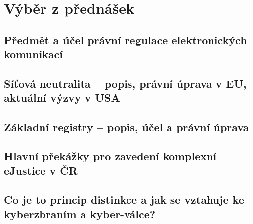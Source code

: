 \section{Výběr z přednášek}

\subsection{Předmět a účel právní regulace elektronických komunikací}


\subsection{Síťová neutralita -- popis, právní úprava v EU, aktuální výzvy v USA}


\subsection{Základní registry -- popis, účel a právní úprava}


\subsection{Hlavní překážky pro zavedení komplexní eJustice v ČR}


\subsection{Co je to princip distinkce a jak se vztahuje ke kyberzbraním a kyber-válce?}